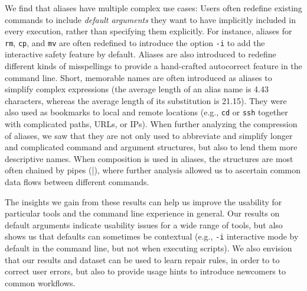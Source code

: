 We find that aliases have multiple complex use cases:
Users often redefine existing commands to include \emph{default arguments} they want to have implicitly included in every execution, rather than specifying them explicitly.
For instance, aliases for \verb|rm|, \verb|cp|, and \verb|mv| are often redefined to introduce the option \verb|-i| to add the interactive safety feature by default.
Aliases are also introduced to redefine different kinds of misspellings to provide a hand-crafted autocorrect feature in the command line. 
Short, memorable names are often introduced as aliases to simplify complex expressions (the average length of an alias name is 4.43 characters, whereas the average length of its substitution is 21.15).
They were also used as bookmarks to local and remote locations (e.g., \verb|cd| or \verb|ssh| together with complicated paths, URLs, or IPs).
When further analyzing the compression of aliases, we saw that they are not only used to abbreviate and simplify longer and complicated command and argument structures, but also to lend them more descriptive names.
When composition is used in aliases, the structures are most often chained by pipes (\verb|||), where further analysis allowed us to ascertain common data flows between different commands.

The insights we gain from these results can help us improve the usability for particular tools and the command line experience in general.
Our results on default arguments indicate usability issues for a wide range of tools, but also shows us that defaults can sometimes be contextual (e.g., \verb|-i| interactive mode by default in the command line, but not when executing scripts).
We also envision that our results and dataset can be used to learn repair rules, in order to to correct user errors, but also to provide usage hints to introduce newcomers to common workflows.